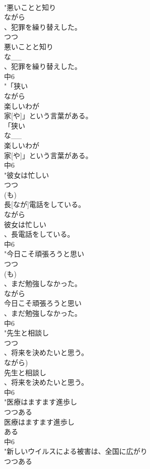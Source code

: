 \documentclass[8pt]{extreport}
\begin{document}
\begin{CJK}{UTF8}{min}
\\	"悪いことと知り
\\	ながら
\\	、犯罪を繰り替えした。
\\	つつ
\\	悪いことと知り
\\	な__
\\	、犯罪を繰り替えした。
\\	中6
\\	"「狭い
\\	ながら
\\	楽しいわが
\\	家[や]」という言葉がある。
\\	「狭い
\\	な__
\\	楽しいわが
\\	家[や]」という言葉がある。
\\	中6
\\	"彼女は忙しい
\\	つつ
\\	(も)
\\	長[なが]電話をしている。
\\	ながら
\\	彼女は忙しい
\\	、長電話をしている。
\\	中6
\\	"今日こそ頑張ろうと思い
\\	つつ
\\	(も)
\\	、まだ勉強しなかった。
\\	ながら
\\	今日こそ頑張ろうと思い
\\	、まだ勉強しなかった。
\\	中6
\\	"先生と相談し
\\	つつ
\\	、将来を決めたいと思う。
\\	ながら)	
\\	先生と相談し
\\	、将来を決めたいと思う。
\\	中6
\\	"医療はますます進歩し
\\	つつある
\\	医療はますます進歩し
\\	ある
\\	中6
\\	"新しいウイルスによる被害は、全国に広がり
\\	つつある

\end{CJK}
\end{document}
